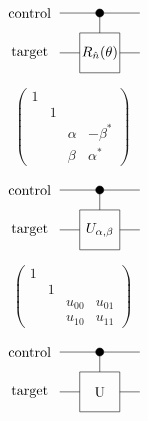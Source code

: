 \documentclass{article}
\begin{document}
\[
             \begin{tikzpicture}[scale=.5]
             \node[draw=none] at (-3.5, 2) {control};
             \node[draw=none] at (-3.5, 0) {target};

             \draw (-2, 2) -- (2, 2);
             \draw[fill=black] (0, 2) circle (.2);
             \draw (0, 2) -- (0, 1);
             
             \draw (-2,0) -- (-1, 0);
             \draw (1, 0) -- (2, 0);
             \draw (-1,-1)--(-1,1)--(1,1)--(1,-1)--cycle;
             \node[draw=none] at (0, 0) {$R_{\hat{n}}(\theta)$};
             \end{tikzpicture}
 \]
\pagebreak

\[
\begin{pmatrix}
1 \\
& 1 \\
& & \alpha & -\beta^* \\
& & \beta & \alpha^*
\end{pmatrix}
\]
\pagebreak

\[
             \begin{tikzpicture}[scale=.5]
             \node[draw=none] at (-3.5, 2) {control};
             \node[draw=none] at (-3.5, 0) {target};

             \draw (-2, 2) -- (2, 2);
             \draw[fill=black] (0, 2) circle (.2);
             \draw (0, 2) -- (0, 1);
             
             \draw (-2,0) -- (-1, 0);
             \draw (1, 0) -- (2, 0);
             \draw (-1,-1)--(-1,1)--(1,1)--(1,-1)--cycle;
             \node[draw=none] at (0, 0) {$U_{\alpha, \beta}$};
             \end{tikzpicture}
 \]
\pagebreak

\[
\begin{pmatrix}
1 \\
& 1 \\
& & u_{00} & u_{01}\\
& & u_{10} & u_{11}
\end{pmatrix}
\]
\pagebreak

\[
             \begin{tikzpicture}[scale=.5]
             \node[draw=none] at (-3.5, 2) {control};
             \node[draw=none] at (-3.5, 0) {target};

             \draw (-2, 2) -- (2, 2);
             \draw[fill=black] (0, 2) circle (.2);
             \draw (0, 2) -- (0, 1);
             
             \draw (-2,0) -- (-1, 0);
             \draw (1, 0) -- (2, 0);
             \draw (-1,-1)--(-1,1)--(1,1)--(1,-1)--cycle;
             \node[draw=none] at (0, 0) {U};
             \end{tikzpicture}
 \]
\pagebreak
\end{document}
